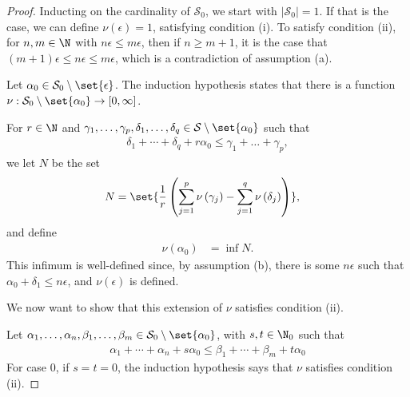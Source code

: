 \documentclass[10pt]{mypackage}
\begin{document}
  \begin{proof}
    Inducting on the cardinality of $\mathcal{S}_0$, we start with $\left\vert \mathcal{S}_0 \right\vert = 1$. If that is the case, we can define $\nu\left(\epsilon\right) = 1$, satisfying condition (i). To satisfy condition (ii), for $n,m\in \N$ with $n\epsilon \leq m\epsilon$, then if $n \geq m + 1$, it is the case that $\left(m+1\right)\epsilon \leq n\epsilon \leq m\epsilon$, which is a contradiction of assumption (a).\newline

    Let $\alpha_0\in \mathcal{S}_0 \setminus \set{\epsilon}$. The induction hypothesis states that there is a function $\nu: \mathcal{S}_0\setminus \set{\alpha_0}\rightarrow \left[0,\infty\right]$.\newline

    For $r\in \N$ and $\gamma_1,\dots,\gamma_p,\delta_1,\dots,\delta_q\in \mathcal{S}\setminus \set{\alpha_0}$ such that
    \begin{align*}
      \delta_1 + \cdots + \delta_q + r\alpha_0 \leq \gamma_1 + \dots + \gamma_p,
    \end{align*}
    we let $N$ be the set
    \begin{align*}
      N &= \set{\frac{1}{r}\left(\sum_{j=1}^{p} \nu\left(\gamma_j\right) - \sum_{j=1}^{q}\nu\left(\delta_j\right)\right)},
    \end{align*}
    and define
    \begin{align*}
      \nu\left(\alpha_0\right) &= \inf N.
    \end{align*}
    This infimum is well-defined since, by assumption (b), there is some $n\epsilon$ such that $\alpha_0 + \delta_1 \leq n\epsilon$, and $\nu\left(\epsilon\right)$ is defined.\newline

    We now want to show that this extension of $\nu$ satisfies condition (ii).\newline

    Let $\alpha_1,\dots,\alpha_n,\beta_1,\dots,\beta_m\in \mathcal{S}_0 \setminus \set{\alpha_0}$, with $s,t\in \N_0$ such that
    \begin{align*}
      \alpha_1 + \cdots + \alpha_n + s\alpha_0 \leq \beta_1 + \cdots + \beta_m + t\alpha_0 \label{eq:eq1}\tag{\textasteriskcentered}
    \end{align*}
    For case 0, if $s = t = 0$, the induction hypothesis says that $\nu$ satisfies condition (ii).\newline


\end{proof}
\end{document}
